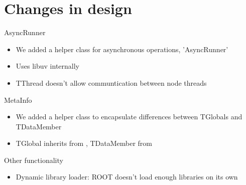 \section{Changes in design}

\begin{frame}{AsyncRunner}
	\begin{itemize}
		\item We added a helper class for asynchronous operations, 'AsyncRunner'
		\item Uses libuv internally
		\item TThread doesn't allow communtication between node threads
	\end{itemize}
\end{frame}

\begin{frame}{MetaInfo}
	\begin{itemize}
		\item We added a helper class to encapsulate differences between TGlobals and TDataMember
		\item TGlobal inherits from , TDataMember from
	\end{itemize}
\end{frame}

\begin{frame}{Other functionality}
	\begin{itemize}
		\item Dynamic library loader: ROOT doesn't load enough libraries on its own
	\end{itemize}
\end{frame}


